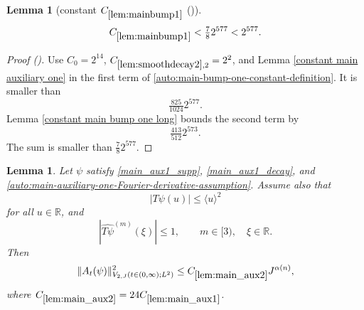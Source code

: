 \documentclass[12pt,reqno]{amsart}
\newcommand{\auto}{{({\tiny\faCar})}}
\theoremstyle{plain}
\newtheorem{lemma}[theorem]{Lemma}
\numberwithin{equation}{section}
\theoremstyle{remark}
\newcommand{\using}[1]{}
\newcommand{\R}{{\mathbb R}}
\begin{document}
\begin{lemma}[constant $C_{\ref{lem:mainbump1}}$ \auto]\label{constant main bump one}\using{lem:smoothdecay2}\using{constant main auxiliary one}\using{lem:mainbump1}\using{constant main bump one long}
\begin{equation}\label{constant main bump one bound}
C_{\ref{lem:mainbump1}}<\tfrac78 2^{577}<2^{577}.
\end{equation}
\end{lemma}
\begin{proof}[Proof \auto]
Use $C_0=2^{14}$, $C_{\ref{lem:smoothdecay2},2}=2^2$, and Lemma \ref{constant main auxiliary one} in the first term of \eqref{auto:main-bump-one-constant-definition}. It is smaller than
\[
\tfrac{825}{1024}2^{577}.
\]
Lemma \ref{constant main bump one long} bounds the second term by
\[
\tfrac{413}{512}2^{573}.
\]
The sum is smaller than $\frac78 2^{577}$.
\end{proof}

\begin{lemma}\label{lem:main_aux2}\using{lem:shortlongftc_reduction}\using{lem:main_aux1}\using{lem:bootstrap}
Let $\psi$ satisfy \eqref{main_aux1_supp}, \eqref{main_aux1_decay}, and \eqref{auto:main-auxiliary-one-Fourier-derivative-assumption}. Assume also that
\begin{equation}\label{main_aux2_decay}
|T\psi(u)|\le\langle u\rangle^2
\end{equation}
for all $u\in\R$, and
\begin{equation}\label{auto:main-auxiliary-two-Fourier-derivative-assumption}
|\widehat{T\psi}^{(m)}(\xi)|\le1,
\qquad
m\in[3),
\quad
\xi\in\R.
\end{equation}
Then
\begin{equation}\label{main_aux2}
\|A_t(\psi)\|_{V_{2,J}(t\in(0,\infty);L^2)}^2
\le C_{\ref{lem:main_aux2}}J^{\alpha(n)},
\end{equation}
where $C_{\ref{lem:main_aux2}}=24C_{\ref{lem:main_aux1}}$.
\end{lemma}
\end{document}
